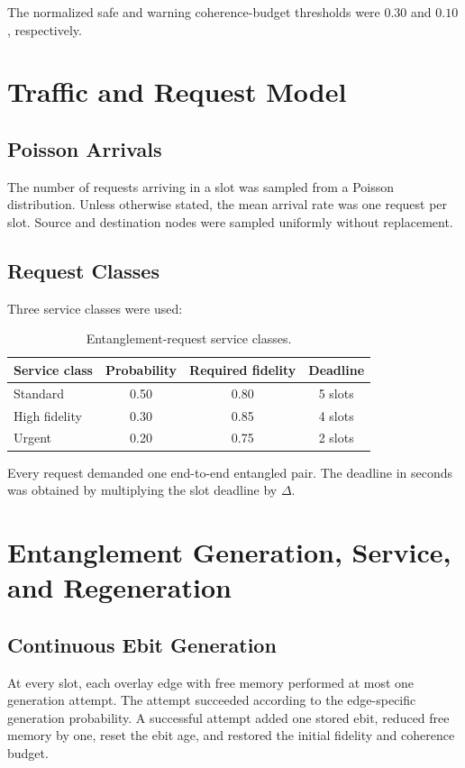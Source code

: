 The normalized safe and warning coherence-budget thresholds were \(0.30\) and
\(0.10\), respectively.

\section{Traffic and Request Model}

\subsection{Poisson Arrivals}

The number of requests arriving in a slot was sampled from a Poisson
distribution. Unless otherwise stated, the mean arrival rate was one request per
slot. Source and destination nodes were sampled uniformly without replacement.

\subsection{Request Classes}

Three service classes were used:

\begin{table}[htbp]
\centering
\caption{Entanglement-request service classes.}
\label{tab:request_classes}
\begin{tabular}{lccc}
\hline
Service class & Probability & Required fidelity & Deadline \\
\hline
Standard & 0.50 & 0.80 & 5 slots \\
High fidelity & 0.30 & 0.85 & 4 slots \\
Urgent & 0.20 & 0.75 & 2 slots \\
\hline
\end{tabular}
\end{table}

Every request demanded one end-to-end entangled pair. The deadline in seconds
was obtained by multiplying the slot deadline by \(\Delta\).

\section{Entanglement Generation, Service, and Regeneration}

\subsection{Continuous Ebit Generation}

At every slot, each overlay edge with free memory performed at most one
generation attempt. The attempt succeeded according to the edge-specific
generation probability. A successful attempt added one stored ebit, reduced free
memory by one, reset the ebit age, and restored the initial fidelity and
coherence budget.

